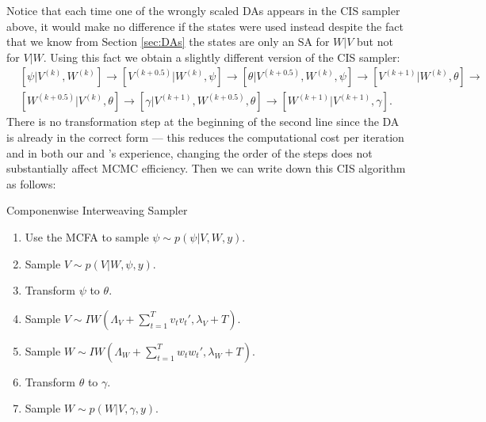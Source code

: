 \documentclass{article}
\begin{document}
Notice that each time one of the wrongly scaled DAs appears in the CIS sampler above, it would make no difference if the states were used instead despite the fact that we know from Section \ref{sec:DAs} the states are only an SA for $W|V$ but not for $V|W$. Using this fact we obtain a slightly different version of the CIS sampler:
\begin{align*}
&[\psi|V^{(k)},W^{(k)}] \to [V^{(k+0.5)}|W^{(k)},\psi] \to [\theta|V^{(k+0.5)},W^{(k)},\psi] \to [V^{(k+1)}|W^{(k)},\theta]\to\\
&[W^{(k+0.5)}|V^{(k)},\theta] \to [\gamma|V^{(k+1)},W^{(k+0.5)},\theta]\to [W^{(k+1)}|V^{(k+1)},\gamma].
\end{align*}
There is no transformation step at the beginning of the second line since the DA is already in the correct form --- this reduces the computational cost per iteration and in both our and 's experience, changing the order of the steps does not substantially affect MCMC efficiency. Then we can write down this CIS algorithm as follows:
\begin{alg*}[CIS]Componenwise Interweaving Sampler\label{alg:DLMcis}
\begin{enumerate}
\item Use the MCFA to sample $\psi \sim p(\psi|V,W,y)$.
\item Sample $V \sim p(V|W,\psi,y)$.
\item Transform $\psi$ to $\theta$.
\item Sample $V \sim IW\left(\Lambda_V + \sum_{t=1}^Tv_tv_t',\lambda_V + T\right)$.
\item Sample $W \sim IW\left(\Lambda_W + \sum_{t=1}^Tw_tw_t',\lambda_{W} + T\right)$.
\item Transform $\theta$ to $\gamma$.
\item Sample $W \sim p(W|V,\gamma,y)$.
\end{enumerate}
\end{alg*}
\end{document}
